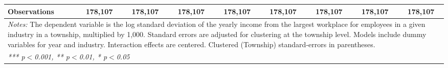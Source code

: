 \begin{tabular}{lcccccccc}
   Observations                                          & 178,107         & 178,107         & 178,107         & 178,107          & 178,107          & 178,107          & 178,107          & 178,107\\  
   \midrule \midrule
\multicolumn{9}{p{24cm}}{\emph{Notes:} The dependent variable is the log 
    standard deviation of the yearly income from the largest workplace for 
    employees in a given industry in a township, multiplied by 1,000. Standard 
    errors are adjusted for clustering at the township level. Models include 
    dummy variables for year and industry. Interaction effects are centered. 
    Clustered (Township) standard-errors in parentheses.}\\
\multicolumn{9}{l}{\emph{*** p$<$0.001, ** p$<$0.01, * p$<$0.05}} \\ 
\end{tabular}
\par\endgroup
